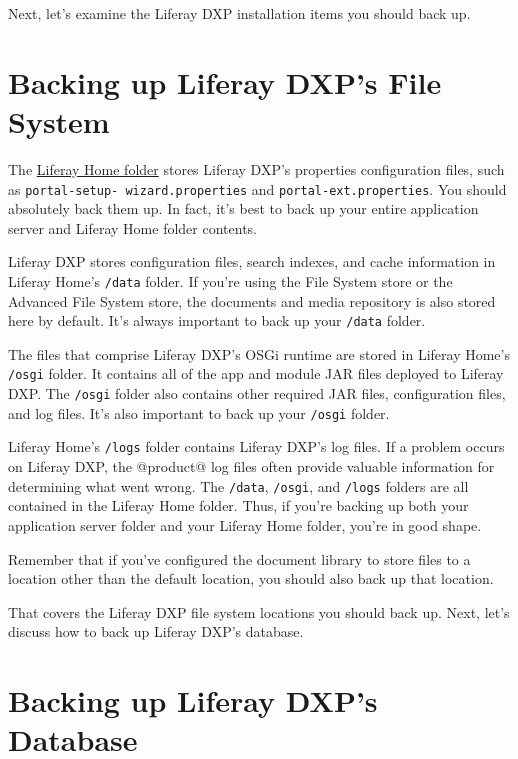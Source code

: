 Next, let's examine the Liferay DXP installation items you should back
up.

\section{Backing up Liferay DXP's File
System}\label{backing-up-liferay-dxps-file-system}

The \href{/docs/7-2/deploy/-/knowledge_base/d/liferay-home}{Liferay Home
folder} stores Liferay DXP's properties configuration files, such as
\texttt{portal-setup-\ wizard.properties} and
\texttt{portal-ext.properties}. You should absolutely back them up. In
fact, it's best to back up your entire application server and Liferay
Home folder contents.

Liferay DXP stores configuration files, search indexes, and cache
information in Liferay Home's \texttt{/data} folder. If you're using the
File System store or the Advanced File System store, the documents and
media repository is also stored here by default. It's always important
to back up your \texttt{/data} folder.

The files that comprise Liferay DXP's OSGi runtime are stored in Liferay
Home's \texttt{/osgi} folder. It contains all of the app and module JAR
files deployed to Liferay DXP. The \texttt{/osgi} folder also contains
other required JAR files, configuration files, and log files. It's also
important to back up your \texttt{/osgi} folder.

Liferay Home's \texttt{/logs} folder contains Liferay DXP's log files.
If a problem occurs on Liferay DXP, the @product@ log files often
provide valuable information for determining what went wrong. The
\texttt{/data}, \texttt{/osgi}, and \texttt{/logs} folders are all
contained in the Liferay Home folder. Thus, if you're backing up both
your application server folder and your Liferay Home folder, you're in
good shape.

Remember that if you've configured the document library to store files
to a location other than the default location, you should also back up
that location.

That covers the Liferay DXP file system locations you should back up.
Next, let's discuss how to back up Liferay DXP's database.

\section{Backing up Liferay DXP's
Database}\label{backing-up-liferay-dxps-database}

